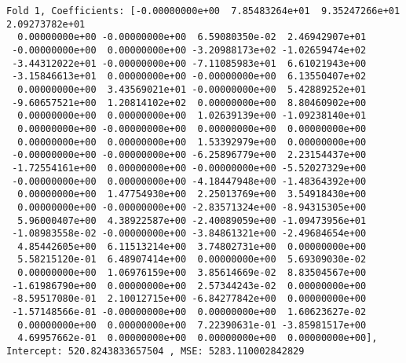 \documentclass[11pt]{article}
\begin{document}
\begin{Verbatim}[commandchars=\\\{\}]
Fold 1, Coefficients: [-0.00000000e+00  7.85483264e+01  9.35247266e+01  2.09273782e+01
  0.00000000e+00 -0.00000000e+00  6.59080350e-02  2.46942907e+01
 -0.00000000e+00  0.00000000e+00 -3.20988173e+02 -1.02659474e+02
 -3.44312022e+01 -0.00000000e+00 -7.11085983e+01  6.61021943e+00
 -3.15846613e+01  0.00000000e+00 -0.00000000e+00  6.13550407e+02
  0.00000000e+00  3.43569021e+01 -0.00000000e+00  5.42889252e+01
 -9.60657521e+00  1.20814102e+02  0.00000000e+00  8.80460902e+00
  0.00000000e+00  0.00000000e+00  1.02639139e+00 -1.09238140e+01
  0.00000000e+00 -0.00000000e+00  0.00000000e+00  0.00000000e+00
  0.00000000e+00  0.00000000e+00  1.53392979e+00  0.00000000e+00
 -0.00000000e+00 -0.00000000e+00 -6.25896779e+00  2.23154437e+00
 -1.72554161e+00  0.00000000e+00 -0.00000000e+00 -5.52027329e+00
 -0.00000000e+00  0.00000000e+00 -4.18447948e+00 -1.48364392e+00
  0.00000000e+00  1.47754930e+00  2.25013769e+00  3.54918430e+00
  0.00000000e+00 -0.00000000e+00 -2.83571324e+00 -8.94315305e+00
  5.96000407e+00  4.38922587e+00 -2.40089059e+00 -1.09473956e+01
 -1.08983558e-02 -0.00000000e+00 -3.84861321e+00 -2.49684654e+00
  4.85442605e+00  6.11513214e+00  3.74802731e+00  0.00000000e+00
  5.58215120e-01  6.48907414e+00  0.00000000e+00  5.69309030e-02
  0.00000000e+00  1.06976159e+00  3.85614669e-02  8.83504567e+00
 -1.61986790e+00  0.00000000e+00  2.57344243e-02  0.00000000e+00
 -8.59517080e-01  2.10012715e+00 -6.84277842e+00  0.00000000e+00
 -1.57148566e-01 -0.00000000e+00  0.00000000e+00  1.60623627e-02
  0.00000000e+00  0.00000000e+00  7.22390631e-01 -3.85981517e+00
  4.69957662e-01  0.00000000e+00  0.00000000e+00  0.00000000e+00], Intercept: 520.8243833657504 , MSE: 5283.110002842829 


\end{Verbatim}
\end{document}
